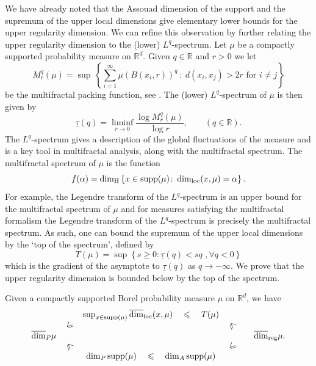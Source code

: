 We have already noted that the Assouad dimension of the support and the supremum of the upper local dimensions give elementary lower bounds for the upper regularity dimension.  We can refine this observation by further relating the upper regularity dimension to the (lower) $L^q$-spectrum.  Let $\mu$ be a compactly supported probability measure on $\mathbb{R}^d$.  Given $q \in \mathbb{R}$ and $r>0$ we let
\[
M_r^q(\mu) = \sup  \, \left \{ \sum_{i=1}^\infty  \mu(B(x_i,r))^q \ : \ d(x_i, x_j) > 2r \text{ for $i \neq j$} \right\}
\]
be the multifractal packing function, see \cite{olsenformalism}.  The  (lower) $L^q$-spectrum of $\mu$ is then given by
\[
\underline{\tau}(q)= \liminf_{r\rightarrow 0} \frac{\log M_r^q(\mu) }{\log r}, \qquad (q\in \mathbb{R}).
\]
The $L^q$-spectrum gives a description of the global fluctuations of the measure and is a key tool in multifractal analysis, along with the multifractal spectrum. The multifractal spectrum of $\mu$ is the function 
\[
f(\alpha) = \dim_{\text{H}} \left\{ x\in \text{supp} (\mu) \colon \dim_{\textup{loc}}(x,\mu) = \alpha \right\}.
\]
For example, the Legendre transform of the $L^q$-spectrum is an upper bound for the multifractal spectrum of $\mu$ and for measures satisfying the multifractal formalism the Legendre transform of the $L^q$-spectrum is precisely the multifractal spectrum. As such, one can bound the supremum of the upper local dimensions by the `top of the spectrum', defined by
\[
T(\mu)=\sup \left\{ s \ge 0 \colon \underline{\tau}(q) < sq \, \,, \forall q<0 \right\}
\]
which is the gradient of the asymptote to $\underline{\tau}(q)$ as $q \rightarrow - \infty$.  We prove that the upper regularity dimension is bounded below by the top of the spectrum.  


\begin{theorem} \label{ch-upper-reg:relationships}
	Given a compactly supported Borel probability measure $\mu$ on $\mathbb{R}^d$, we have
	\[
	\begin{array}{ccccccccccc}
	&&                  \sup_ {x\in \mathrm{supp}(\mu)}  \overline{\dim}_{\mathrm{loc}}(x,\mu)   \quad  \leq    \quad   T(\mu)                        & & &    \\
	&                       \rotatebox[origin=c]{45}{$\leq$}          & &              \rotatebox[origin=c]{315}{$\leq$} & &   \\
	\overline{\dim}_\text{\emph{P}} \mu                                            & &        &&                  & \r.\\
	&                \rotatebox[origin=c]{315}{$\leq$}              &&           \rotatebox[origin=c]{45}{$\leq$} & &  \\
	&&                                            \dim_\text{\emph{P}} \mathrm{supp}(\mu)      \quad  \leq   \quad  \dim_\text{\emph{A}} \mathrm{supp}(\mu)                           & & &  
	\end{array}
	\]
\end{theorem}

